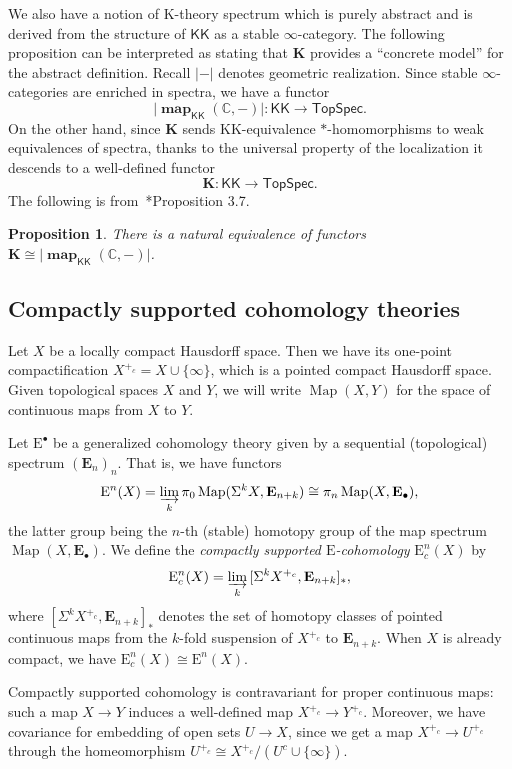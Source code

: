 \documentclass[a4paper,reqno]{amsart}
\theoremstyle{plain}
\newtheorem{proposition}[theorem]{Proposition}
\theoremstyle{definition}
\theoremstyle{remark}
\numberwithin{equation}{section}
\newcommand{\rE}{\mathrm{E}}
\newcommand{\rK}{\mathrm{K}}
\newcommand{\dC}{\mathbb{C}}
\newcommand{\bE}{\mathbf{E}}
\newcommand{\bK}{\mathbf{K}}
\newcommand{\TopSpec}{\mathsf{TopSpec}}
\newcommand{\KK}{\mathrm{KK}}
\newcommand{\icKK}{\mathsf{KK}}
\newcommand{\gr}[1]{\lvert #1\rvert}
\DeclareMathOperator{\Map}{Map}
\DeclareMathOperator{\map}{\mathbf{map}}
\begin{document}
We also have a notion of $\rK$-theory spectrum which is purely abstract and is derived from the structure of $\icKK$ as a stable $\infty$-category. The following proposition can be interpreted as stating that $\bK$ provides a ``concrete model'' for the abstract definition. Recall $\gr{-}$ denotes geometric realization. Since stable $\infty$-categories are enriched in spectra, we have a functor
\[
\gr{\map_{\icKK}(\dC,-)}\colon \icKK\to \TopSpec.
\]
On the other hand, since $\bK$ sends $\KK$-equivalence $\ast$-homomorphisms to weak equivalences of spectra, thanks to the universal property of the localization it descends to a well-defined functor
\[
\bK \colon \icKK\to \TopSpec.
\]
The following is from~\cite{landnik:comp}*{Proposition 3.7}.

\begin{proposition}%
    There is a natural equivalence of functors $\bK \cong  \gr{\map_{\icKK}(\dC,-)}$. 
\end{proposition}

\subsection{Compactly supported cohomology theories}\label{subsec:cscsec}

Let $X$ be a locally compact Hausdorff space.
Then we have its one-point compactification $X^{+_c} = X \cup \{ \infty \}$, which is a pointed compact Hausdorff space.
Given topological spaces $X$ and $Y$, we will write $\Map(X,Y)$ for the space of continuous maps from $X$ to $Y$. 

Let $\rE^\bullet$ be a generalized cohomology theory given by a sequential (topological) spectrum $(\bE_n)_n$.
That is, we have functors
\[
\rE^n(X)= \varinjlim_k \pi_0\Map(\Sigma^k X, \bE_{n+k})\cong \pi_n \Map(X, \bE_\bullet),
\]
the latter group being the $n$-th (stable) homotopy group of the map spectrum $\Map(X, \bE_\bullet)$.
We define the \emph{compactly supported $\rE$-cohomology} $\rE_c^n(X)$ by
\begin{equation}\label{eq:csc}
\rE_c^n(X) = \varinjlim_k \,[\Sigma^k X^{+_c}, \bE_{n + k}]_*,
\end{equation}
where $[\Sigma^k X^{+_c}, \bE_{n + k}]_*$ denotes the set of homotopy classes of pointed continuous maps from the $k$-fold suspension of $X^{+_c}$ to $\bE_{n + k}$.
When $X$ is already compact, we have $\rE_c^n(X)\cong \rE^n(X)$.

Compactly supported cohomology is contravariant for proper continuous maps: such a map $X \to Y$ induces a well-defined map $X^{+_c} \to Y^{+_c}$. Moreover, we have covariance for embedding of open sets $U \to X$, since we get a map $X^{+_c} \to U^{+_c}$ through the homeomorphism $U^{+_c} \cong X^{+_c}/(U^c \cup \{ \infty \})$.
\end{document}
